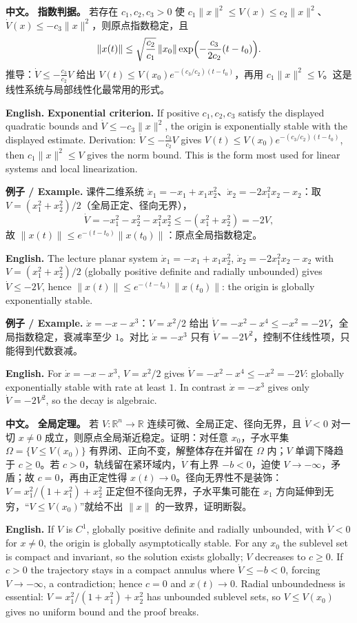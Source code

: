 \documentclass[UTF8,11pt,a4paper]{ctexart}
\newcommand{\EN}[1]{\par\noindent\textbf{English.} #1\par}
\newcommand{\EX}[2]{\par\noindent\textbf{例子 / Example.} #1\par\EN{#2}}
\newcommand{\APS}[2]{\par\noindent\textbf{中文。} #1\par\noindent\textbf{English.} #2\par}
\newcommand{\R}{\mathbb{R}}\newcommand{\N}{\mathbb{N}}
\newcommand{\norm}[1]{\lVert #1\rVert}\newcommand{\abs}[1]{\lvert #1\rvert}
\begin{document}
\APS{\textbf{指数判据。} 若存在 $c_1,c_2,c_3>0$ 使 $c_1\norm{x}^2\le V(x)\le c_2\norm{x}^2$、$\dot V(x)\le-c_3\norm{x}^2$，则原点指数稳定，且
\[
\norm{x(t)}\le\sqrt{\frac{c_2}{c_1}}\,\norm{x_0}\exp\Bigl(-\frac{c_3}{2c_2}(t-t_0)\Bigr).
\]
推导：$\dot V\le-\frac{c_3}{c_2}V$ 给出 $V(t)\le V(x_0)e^{-(c_3/c_2)(t-t_0)}$，再用 $c_1\norm{x}^2\le V$。这是线性系统与局部线性化最常用的形式。}{\textbf{Exponential criterion.} If positive $c_1,c_2,c_3$ satisfy the displayed quadratic bounds and $\dot V\le-c_3\norm{x}^2$, the origin is exponentially stable with the displayed estimate. Derivation: $\dot V\le-\frac{c_3}{c_2}V$ gives $V(t)\le V(x_0)e^{-(c_3/c_2)(t-t_0)}$, then $c_1\norm{x}^2\le V$ gives the norm bound. This is the form most used for linear systems and local linearization.}

\EX{课件二维系统 $\dot x_1=-x_1+x_1x_2^2$、$\dot x_2=-2x_1^2x_2-x_2$：取 $V=(x_1^2+x_2^2)/2$（全局正定、径向无界），
\[
\dot V=-x_1^2-x_2^2-x_1^2x_2^2\le-(x_1^2+x_2^2)=-2V,
\]
故 $\norm{x(t)}\le e^{-(t-t_0)}\norm{x(t_0)}$：原点全局指数稳定。}{The lecture planar system $\dot x_1=-x_1+x_1x_2^2$, $\dot x_2=-2x_1^2x_2-x_2$ with $V=(x_1^2+x_2^2)/2$ (globally positive definite and radially unbounded) gives $\dot V\le-2V$, hence $\norm{x(t)}\le e^{-(t-t_0)}\norm{x(t_0)}$: the origin is globally exponentially stable.}

\EX{$\dot x=-x-x^3$：$V=x^2/2$ 给出 $\dot V=-x^2-x^4\le-x^2=-2V$，全局指数稳定，衰减率至少 $1$。对比 $\dot x=-x^3$ 只有 $\dot V=-2V^2$，控制不住线性项，只能得到代数衰减。}{For $\dot x=-x-x^3$, $V=x^2/2$ gives $\dot V=-x^2-x^4\le-x^2=-2V$: globally exponentially stable with rate at least $1$. In contrast $\dot x=-x^3$ gives only $\dot V=-2V^2$, so the decay is algebraic.}

\APS{\textbf{全局定理。} 若 $V:\R^n\to\R$ 连续可微、全局正定、径向无界，且 $\dot V<0$ 对一切 $x\ne0$ 成立，则原点全局渐近稳定。证明：对任意 $x_0$，子水平集 $\Omega=\{V\le V(x_0)\}$ 有界闭、正向不变，解整体存在并留在 $\Omega$ 内；$V$ 单调下降趋于 $c\ge0$。若 $c>0$，轨线留在紧环域内，$\dot V$ 有上界 $-b<0$，迫使 $V\to-\infty$，矛盾；故 $c=0$，再由正定性得 $x(t)\to0$。径向无界性不是装饰：$V=x_1^2/(1+x_1^2)+x_2^2$ 正定但不径向无界，子水平集可能在 $x_1$ 方向延伸到无穷，“$V\le V(x_0)$”就给不出 $\norm{x}$ 的一致界，证明断裂。}{If $V$ is $C^1$, globally positive definite and radially unbounded, with $\dot V<0$ for $x\ne0$, the origin is globally asymptotically stable. For any $x_0$ the sublevel set is compact and invariant, so the solution exists globally; $V$ decreases to $c\ge0$. If $c>0$ the trajectory stays in a compact annulus where $\dot V\le-b<0$, forcing $V\to-\infty$, a contradiction; hence $c=0$ and $x(t)\to0$. Radial unboundedness is essential: $V=x_1^2/(1+x_1^2)+x_2^2$ has unbounded sublevel sets, so $V\le V(x_0)$ gives no uniform bound and the proof breaks.}
\end{document}

